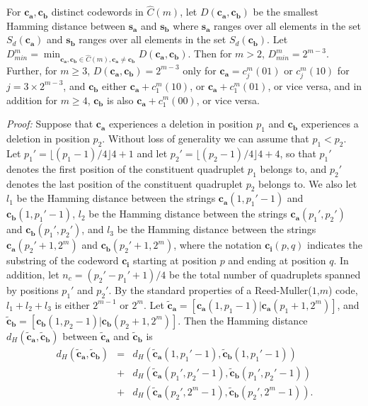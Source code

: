 \begin{lemma}\label{LE1}
For $\mathbf{c_a},\mathbf{c_b}$ distinct codewords in
$\hat{C}(m)$, let $D(\mathbf{c_a},\mathbf{c_b})$ be the smallest
Hamming distance between $\mathbf{s_a}$ and $\mathbf{s_b}$ where
$\mathbf{s_a}$ ranges over all elements in the set
$S_d(\mathbf{c_a})$ and $\mathbf{s_b}$ ranges over all elements in
the set $S_d(\mathbf{c_b})$. Let
$D_{min}^m=\min_{\mathbf{c_a},\mathbf{c_b} \in \hat{C}(m),
\mathbf{c_a}\neq \mathbf{c_b}} D(\mathbf{c_a},\mathbf{c_b})$. Then
for $m>2$, $D_{min}^m=2^{m-3}$. Further, for $m \ge 3$,
$D(\mathbf{c_a},\mathbf{c_b})=2^{m-3}$ only for
$\mathbf{c_a}=c_j^m(01)$ or $c_j^m(10)$ for $j=3 \times 2^{m-3}$,
and $\mathbf{c_b}$ either $\mathbf{c_a}+c_1^m(10)$, or
$\mathbf{c_a}+c_1^m(01)$, or vice versa, and in addition for $m
\geq 4$, $\mathbf{c_b}$ is also $\mathbf{c_a}+c_1^m(00)$, or vice
versa.
\end{lemma}
\noindent \textit{Proof:} Suppose that $\mathbf{c_a}$ experiences
a deletion in position $p_1$ and $\mathbf{c_b}$ experiences a
deletion in position $p_2$. Without loss of generality we can
assume that $p_1 <p_2$. Let $p_1'= \lfloor(p_1-1)/4 \rfloor 4+1$
and let $p_2'= \lfloor(p_2-1)/4 \rfloor 4+4$, so that $p_1'$
denotes the first position of the constituent quadruplet $p_1$
belongs to, and $p_2'$ denotes the last position of the
constituent quadruplet $p_2$ belongs to. We also let $l_1$ be the
Hamming distance between the strings $\mathbf{c_a}(1,p_1'-1)$ and
$\mathbf{c_b}(1,p_1'-1)$, $l_2$ be the Hamming distance between
the strings $\mathbf{c_a}(p_1',p_2')$ and
$\mathbf{c_b}(p_1',p_2')$, and $l_3$ be the Hamming distance
between the strings $\mathbf{c_a}(p_2'+1,2^{m})$ and
$\mathbf{c_b}(p_2'+1,2^{m})$, where the notation
$\mathbf{c_i}(p,q)$ indicates the substring of the codeword
$\mathbf{c_i}$ starting at position $p$ and ending at position
$q$. In addition, let $n_c=(p_2'-p_1'+1)/4$ be the total number of
quadruplets spanned by positions $p_1'$ and $p_2'$. By the
standard properties of a Reed-Muller($1$,$m$) code, $l_1+l_2+l_3$
is either $2^{m-1}$ or $2^m$. Let
$\mathbf{\tilde{c}_a}=[\mathbf{c_a}(1,p_1-1) |
\mathbf{c_a}(p_1+1,2^m)]$, and
$\mathbf{\tilde{c}_b}=[\mathbf{c_b}(1,p_2-1) |
\mathbf{c_b}(p_2+1,2^m)]$. Then the Hamming distance
$d_{H}(\mathbf{\tilde{c}_a},\mathbf{\tilde{c}_b})$ between
$\mathbf{\tilde{c}_a}$ and $\mathbf{\tilde{c}_b}$ is
\begin{eqnarray*}
d_{H}(\mathbf{\tilde{c}_a},\mathbf{\tilde{c}_b})&=&
d_H\left(\mathbf{\tilde{c}_a}(1,p_1'-1),\mathbf{\tilde{c}_b}(1,p_1'-1)\right)\\
{}&+&d_H\left(\mathbf{\tilde{c}_a}(p_1',p_2'-1),\mathbf{\tilde{c}_b}(p_1',p_2'-1)\right)\\
{}&+&d_H\left(\mathbf{\tilde{c}_a}(p_2',2^m-1),\mathbf{\tilde{c}_b}(p_2',2^m-1)\right).
\end{eqnarray*}


